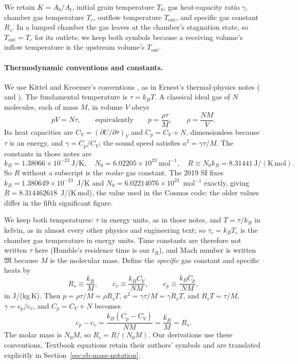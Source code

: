 We retain $K=A_b/A_t$, initial grain temperature $T_b$, gas heat-capacity
ratio $\gamma$, chamber gas temperature $T_c$, outflow temperature
$T_{\mathrm{out}}$, and specific gas constant $R_s$. In a lumped chamber
the gas leaves at the chamber's stagnation state, so $T_{\mathrm{out}}=T_c$
for its outlets; we keep both symbols because a receiving volume's inflow
temperature is the upstream volume's $T_{\mathrm{out}}$.

\paragraph{Thermodynamic conventions and constants.} We use Kittel and
Kroemer's conventions \cite{CKittelHKroemer1980}, as in Ernest's
thermal-physics notes (
and ). The fundamental temperature is
$\tau=k_BT$. A classical ideal gas of $N$ molecules, each of mass $M$, in
volume $V$ obeys
\[
 pV=N\tau,\qquad\text{equivalently}\qquad p=\frac{\rho\tau}{M},
 \qquad \rho=\frac{NM}{V}.
\]
Its heat capacities are $C_V=(\partial U/\partial\tau)_V$ and
$C_p=C_V+N$, dimensionless because $\tau$ is an energy, and
$\gamma=C_p/C_V$; the sound speed satisfies $a^2=\gamma\tau/M$.
The constants in those notes are
\[
 k_B=1.38066\times10^{-23}\ \mathrm{J/K},\quad
 N_0=6.02205\times10^{23}\ \mathrm{mol^{-1}},\quad
 R\equiv N_0k_B=8.31441\ \mathrm{J/(K\,mol)}.
\]
So $R$ without a subscript is the \emph{molar} gas constant. The
2019 SI fixes $k_B=1.380649\times10^{-23}$~J/K and
$N_0=6.02214076\times10^{23}$~mol$^{-1}$ exactly, giving
$R=8.314462618$~J/(K\,mol), the value used in the Cosmos code; the
older values differ in the fifth significant figure.

We keep both temperatures: $\tau$ in energy units, as in those notes,
and $T=\tau/k_B$ in kelvin, as in almost every other physics and
engineering text; so $\tau_c=k_BT_c$ is the chamber gas temperature in
energy units. Time constants are therefore not written $\tau$ here
(Humble's residence time is our $t_R$), and Mach number is written
$\mathfrak M$ because $M$ is
the molecular mass. Define the \emph{specific} gas constant and
specific heats by
\[
 R_s\equiv\frac{k_B}{M},\qquad
 c_v\equiv\frac{k_BC_V}{NM},\qquad
 c_p\equiv\frac{k_BC_p}{NM},
\]
in J/(kg\,K). Then $p=\rho\tau/M=\rho R_sT$, $a^2=\gamma\tau/M=\gamma R_sT$, and $R_sT=\tau/M$,
$\gamma=c_p/c_v$, and $C_p=C_V+N$ becomes
\[
 c_p-c_v=\frac{k_B(C_p-C_V)}{NM}=\frac{k_B}{M}=R_s .
\]
The molar mass is $N_0M$, so $R_s=R/(N_0M)$. Our derivations use these conventions. Textbook equations
retain their authors' symbols and are translated explicitly in
Section~\ref{sec:sb-mass-notation}.


